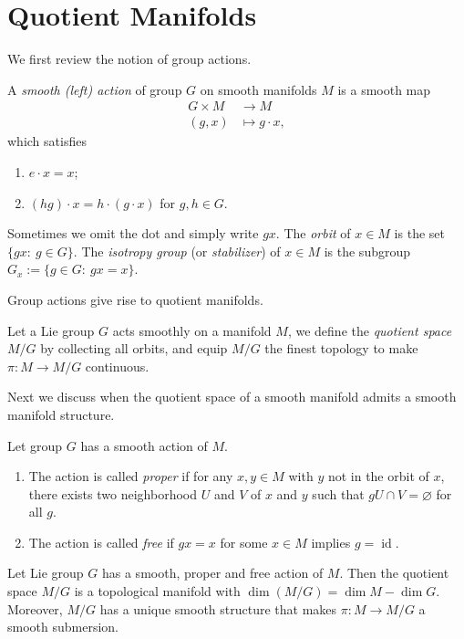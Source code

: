 \section{Quotient Manifolds}

We first review the notion of group actions.
\begin{defn}
    A \emph{smooth (left) action} of group $G$ on smooth manifolds $M$ is a smooth map
    \begin{align*}
        G\times M&\to M\\
        (g,x)&\mapsto g\cdot x,
    \end{align*}
    which satisfies
    \begin{enumerate}[(1)]
        \item $e\cdot x=x$;
        \item $(hg)\cdot x=h\cdot(g\cdot x)$ for $g,h\in G$.
    \end{enumerate}
    Sometimes we omit the dot and simply write $gx$.
    The \emph{orbit} of $x\in M$ is the set $\{gx:\ g\in G\}$.
    The \emph{isotropy group} (or \emph{stabilizer}) of $x\in M$ is the subgroup $G_x:=\{g\in G:\ gx=x\}$.
\end{defn}

Group actions give rise to quotient manifolds.
\begin{defn}
    Let a Lie group $G$ acts smoothly on a manifold $M$, we define the \emph{quotient space} $M/G$ by collecting all orbits, and equip $M/G$ the finest topology to make $\pi:M\to M/G$ continuous.
\end{defn}

Next we discuss when the quotient space of a smooth manifold admits a smooth manifold structure.
\begin{defn}Let group $G$ has a smooth action of $M$.
    \begin{enumerate}[(1)]
        \item The action is called \emph{proper} if for any $x,y\in M$ with $y$ not in the orbit of $x$, there exists two neighborhood $U$ and $V$ of $x$ and $y$ such that $gU\cap V=\varnothing$ for all $g$.
        \item The action is called \emph{free} if $gx=x$ for some $x\in M$ implies $g=\operatorname{id}$.
    \end{enumerate}
\end{defn}

\begin{thm}
    Let Lie group $G$ has a smooth, proper and free action of $M$.
    Then the quotient space $M/G$ is a topological manifold with $\dim(M/G)=\dim{M}-\dim{G}$.
    Moreover, $M/G$ has a unique smooth structure that makes $\pi:M\to M/G$ a smooth submersion.
\end{thm}

